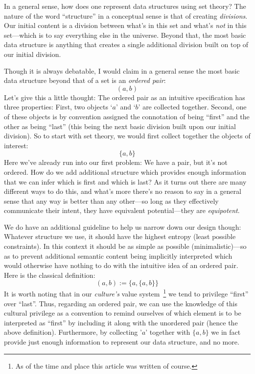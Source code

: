 \documentclass[twoside]{article}
\begin{document}
In a general sense, how does one represent data structures using set theory?  The nature of the word ``structure''
in a conceptual sense is that of creating \emph{divisions}. Our initial content is a division between what's in this set
and what's \emph{not} in this set---which is to say everything else in the universe. Beyond that, the most basic data
structure is anything that creates a single additional division built on top of our initial division.

Though it is always debatable, I would claim in a general sense the most
basic data structure beyond that of a set is an \emph{ordered pair}:
$$ (a,b) $$
Let's give this a little thought: The ordered pair as an intuitive specification has three properties: First, two objects `$ a $'
and `$ b $' are collected together. Second, one of these objects is by convention assigned the connotation of being ``first''
and the other as being ``last'' (this being the next basic division built upon our initial division). So to start with set theory,
we would first collect together the objects of interest:
$$ \{a,b\} $$
Here we've already run into our first problem: We have a pair, but it's not ordered. How do we add additional structure which
provides enough information that we can infer which is first and which is last? As it turns out there are many different ways
to do this, and what's more there's no reason to say in a general sense that any way is better than any other---so long as they
effectively communicate their intent, they have equivalent potential---they are \emph{equipotent}.

We do have an additional guideline to help us narrow down our design though: Whatever structure we use, it should have the highest
entropy (least possible constraints). In this context it should be as simple as possible (minimalistic)---so as to prevent
additional semantic content being implicitly interpreted which would otherwise have nothing to do with the intuitive idea
of an ordered pair. Here is the classical definition:
$$ (a,b):=\{a,\{a,b\}\} $$
It is worth noting that in our \emph{culture's} value system\ \footnote{As of the time and place this article
was written of course.} we tend to privilege ``first'' over ``last''. Thus, regarding an ordered pair, we can use
the knowledge of this cultural privilege as a convention to remind ourselves of which element is to be interpreted
as ``first'' by including it along with the unordered pair (hence the above definition).  Furthermore, by collecting
'$ a $' together with $ \{a,b\} $ we in fact provide just enough information to represent our data structure, and no more.
\end{document}

